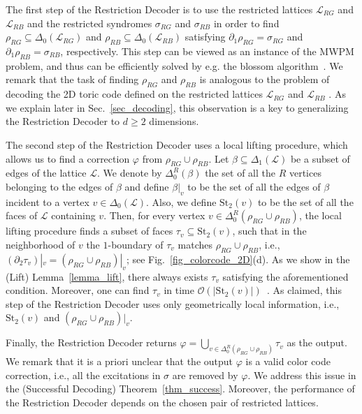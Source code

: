 \documentclass[onecolumn,letterpaper,11pt,accepted=2022-12-19]{quantumarticle}
\newcommand{\face}[2]{{\Delta_{#1}(#2)}}
\newcommand{\facex}[3]{{\Delta^{#1}_{#2}(#3)}}
\renewcommand{\star}[2]{{\mathrm{St}_{#1}(#2)}}
\newcommand{\rest}[1]{|_{#1}}
\renewcommand{\phi}{\varphi}
\theoremstyle{definition}
\theoremstyle{lemma}
\theoremstyle{theorem}
\theoremstyle{corollary}
\begin{document}
The first step of the Restriction Decoder is to use the restricted lattices $\mathcal{L}_{RG}$ and $\mathcal{L}_{RB}$ and the restricted syndromes $\sigma_{RG}$ and $\sigma_{RB}$ in order to find $\rho_{RG}\subseteq\face 0 {\mathcal{L}_{RG}}$ and $\rho_{RB}\subseteq\face 0 {\mathcal{L}_{RB}}$ satisfying $\partial_1 \rho_{RG} = \sigma_{RG}$ and $\partial_1 \rho_{RB} = \sigma_{RB}$, respectively.
This step can be viewed as an instance of the MWPM problem, and thus can be efficiently solved by e.g. the blossom algorithm~\cite{Edmonds1965}.
We remark that the task of finding $\rho_{RG}$ and $\rho_{RB}$ is analogous to the problem of decoding the 2D toric code defined on the restricted lattices $\mathcal{L}_{RG}$ and $\mathcal{L}_{RB}$ \cite{Bombin2012a,Delfosse2014}.
As we explain later in Sec.~\ref{sec_decoding}, this observation is a key to generalizing the Restriction Decoder to $d\geq 2$ dimensions.


The second step of the Restriction Decoder uses a local lifting procedure, which allows us to find a correction $\phi$ from $\rho_{RG}\cup\rho_{RB}$.
Let $\beta\subseteq\face 1 {\mathcal{L}}$ be a subset of edges of the lattice $\mathcal{L}$.
We denote by $\facex R 0 \beta$ the set of all the $R$ vertices belonging to the edges of $\beta$ and define $\beta\rest v$ to be the set of all the edges of $\beta$ incident to a vertex $v\in\face 0 {\mathcal{L}}$.
Also, we define $\star 2 v$ to be the set of all the faces of $\mathcal{L}$ containing $v$.
Then, for every vertex $v\in\facex R 0 {\rho_{RG}\cup\rho_{RB}}$, the local lifting procedure finds a subset of faces $\tau_v\subseteq \star 2 v$, such that in the neighborhood of $v$ the $1$-boundary of $\tau_v$ matches $\rho_{RG}\cup\rho_{RB}$, i.e., $(\partial_2 \tau_v)\rest v = (\rho_{RG}\cup\rho_{RB})\rest v$; see Fig.~\ref{fig_colorcode_2D}(d).
As we show in the (Lift) Lemma~\ref{lemma_lift}, there always exists $\tau_v$ satisfying the aforementioned condition.
Moreover, one can find $\tau_v$ in time $\mathcal O(|\star 2 v|)$~\cite{Kubicathesis}.
As claimed, this step of the Restriction Decoder uses only geometrically local information, i.e., $\star 2 v$ and $(\rho_{RG}\cup\rho_{RB})\rest v$.


Finally, the Restriction Decoder returns $\phi = \bigcup_{v\in\facex R 0 {\rho_{RG}\cup\rho_{RB}}} \tau_v$ as the output.
We remark that it is a priori unclear that the output $\phi$ is a valid color code correction, i.e., all the excitations in $\sigma$ are removed by $\phi$.
We address this issue in the (Successful Decoding) Theorem~\ref{thm_success}.
Moreover, the performance of the Restriction Decoder depends on the chosen pair of restricted lattices.
\end{document}
